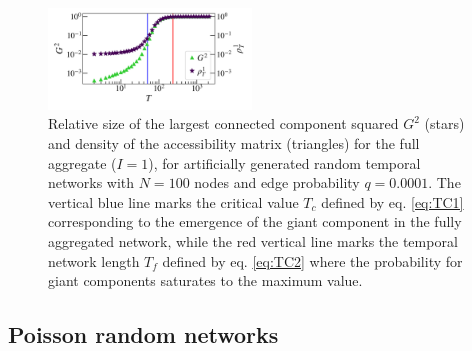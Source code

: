 \documentclass[%
 reprint,
 amsmath,amssymb,
 aps,
]{revtex4-2}
\begin{document}
\begin{figure}[]
\includegraphics[width=0.48\textwidth]{fig/ER_G_ana2_log.png}
\caption{\label{fig:ERgiantsq} Relative size of the largest connected component squared $G^2$ (stars) and density of the accessibility matrix (triangles) for the full aggregate ($I=1$), for artificially generated random temporal networks with $N=100$ nodes and  edge probability $q= 0.0001$. The vertical blue line marks the critical value $T_c$ defined by eq. \eqref{eq:TC1} corresponding to the emergence of the giant component in the fully aggregated network, while the red vertical line marks the temporal network length $T_f$ defined by eq. \eqref{eq:TC2} where the probability for giant components saturates to the maximum value. 
}
\end{figure}






\subsection{\label{sec:ERresults} Poisson random networks}
\end{document}
